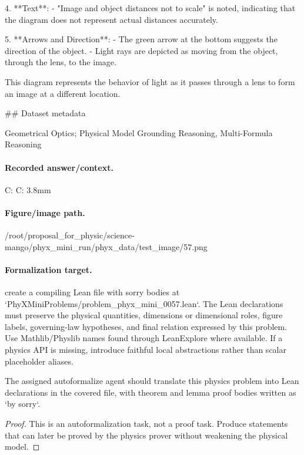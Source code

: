 4. **Text**: 
   - "Image and object distances not to scale" is noted, indicating that the diagram does not represent actual distances accurately.

5. **Arrows and Direction**:
   - The green arrow at the bottom suggests the direction of the object.
   - Light rays are depicted as moving from the object, through the lens, to the image.

This diagram represents the behavior of light as it passes through a lens to form an image at a different location.

\#\# Dataset metadata

Geometrical Optics; Physical Model Grounding Reasoning, Multi-Formula Reasoning

\paragraph{Recorded answer/context.}
C: C: 3.8mm

\paragraph{Figure/image path.}
/root/proposal\_for\_physic/science-mango/phyx\_mini\_run/phyx\_data/test\_image/57.png

\paragraph{Formalization target.}
create a compiling Lean file with sorry bodies at `PhyXMiniProblems/problem\_phyx\_mini\_0057.lean`. The Lean declarations must preserve the physical quantities, dimensions or dimensional roles, figure labels, governing-law hypotheses, and final relation expressed by this problem.
Use Mathlib/Physlib names found through LeanExplore where available. If a physics API is missing, introduce faithful local abstractions rather than scalar placeholder aliases.

\begin{theorem}
\label{thm:physics:phyx_mini_0057:target}
The assigned autoformalize agent should translate this physics problem into Lean declarations in the covered file, with theorem and lemma proof bodies written as `by sorry`.
\end{theorem}
\begin{proof}
This is an autoformalization task, not a proof task. Produce statements that can later be proved by the physics prover without weakening the physical model.
\end{proof}

